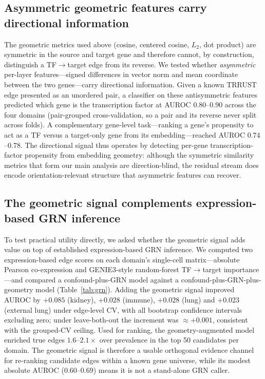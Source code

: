 \documentclass[11pt]{article}
\begin{document}
\subsection*{Asymmetric geometric features carry directional information}

The geometric metrics used above (cosine, centered cosine, $L_2$, dot product) are symmetric in the source and target gene and therefore cannot, by construction, distinguish a TF$\rightarrow$target edge from its reverse.
We tested whether \emph{asymmetric} per-layer features---signed differences in vector norm and mean coordinate between the two genes---carry directional information.
Given a known TRRUST edge presented as an unordered pair, a classifier on these antisymmetric features predicted which gene is the transcription factor at AUROC $0.80$--$0.90$ across the four domains (pair-grouped cross-validation, so a pair and its reverse never split across folds).
A complementary gene-level task---ranking a gene's propensity to act as a TF versus a target-only gene from its embedding---reached AUROC $0.74$--$0.78$.
The directional signal thus operates by detecting per-gene transcription-factor propensity from embedding geometry: although the symmetric similarity metrics that form our main analysis are direction-blind, the residual stream does encode orientation-relevant structure that asymmetric features can recover.

\subsection*{The geometric signal complements expression-based GRN inference}

To test practical utility directly, we asked whether the geometric signal adds value on top of established expression-based GRN inference.
We computed two expression-based edge scores on each domain's single-cell matrix---absolute Pearson co-expression and GENIE3-style random-forest TF$\rightarrow$target importance---and compared a confound-plus-GRN model against a confound-plus-GRN-plus-geometry model (Table~\ref{tab:grn}).
Adding the geometric signal improved AUROC by $+0.085$ (kidney), $+0.028$ (immune), $+0.028$ (lung) and $+0.023$ (external lung) under edge-level CV, with all bootstrap confidence intervals excluding zero; under leave-both-out the increment was $\approx +0.001$, consistent with the grouped-CV ceiling.
Used for ranking, the geometry-augmented model enriched true edges $1.6$--$2.1\times$ over prevalence in the top 50 candidates per domain.
The geometric signal is therefore a usable orthogonal evidence channel for re-ranking candidate edges within a known gene universe, while its modest absolute AUROC ($0.60$--$0.69$) means it is not a stand-alone GRN caller.
\end{document}
